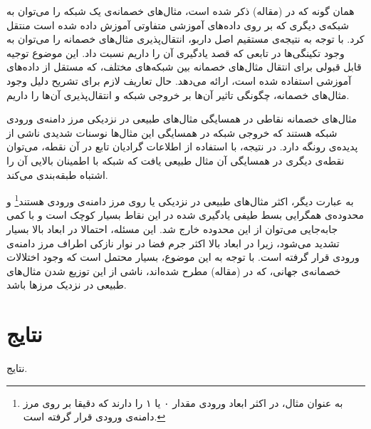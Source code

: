 \documentclass[12pt,onecolumn,a4paper]{article}
\begin{document}
همان گونه که در (مقاله) ذکر شده است، مثال‌های خصمانه‌ی یک شبکه را می‌توان به شبکه‌ی دیگری که بر روی داده‌های آموزشی متفاوتی آموزش داده شده است منتقل کرد. با توجه به نتیجه‌ی مستقیم اصل داربو، انتقال‌پذیری مثال‌های خصمانه را می‌توان به وجود تکینگی‌ها در تابعی که قصد یادگیری آن را داریم نسبت داد. این موضوع توجیه قابل قبولی برای انتقال مثال‌های خصمانه بین شبکه‌های مختلف، که مستقل از داده‌های آموزشی استفاده شده است، ارائه می‌دهد. حال تعاریف لازم برای تشریح دلیل وجود مثال‌های خصمانه، چگونگی تاثیر آن‌ها بر خروجی شبکه و انتقال‌پذیری آن‌ها را داریم.

مثال‌های خصمانه نقاطی در همسایگی مثال‌های طبیعی در نزدیکی مرز دامنه‌ی ورودی شبکه هستند که خروجی شبکه در همسایگی این مثال‌ها نوسنات شدیدی ناشی از پدیده‌ی رونگه دارد. در نتیجه، با استفاده از اطلاعات گرادیان تابع در آن نقطه، می‌توان نقطه‌ی دیگری در همسایگی آن مثال طبیعی یافت که شبکه با اطمینان بالایی آن را اشتباه طبقه‌بندی می‌کند.

به عبارت دیگر، اکثر مثال‌های طبیعی در نزدیکی یا روی مرز دامنه‌ی ورودی هستند\footnote{به عنوان مثال، در 
اکثر ابعاد ورودی مقدار ۰ یا ۱ را دارند که دقیقا بر روی مرز دامنه‌ی ورودی قرار گرفته است.}
و محدوده‌ی همگرایی بسط طیفی یادگیری شده در این نقاط بسیار کوچک است و با کمی جابه‌جایی می‌توان از این محدوده خارج شد. این مسئله، احتمالا در ابعاد بالا بسیار تشدید می‌شود، زیرا در ابعاد بالا اکثر جرم فضا در نوار نازکی اطراف مرز دامنه‌ی ورودی قرار گرفته است. با توجه به این موضوع، بسیار محتمل است که وجود اختلالات خصمانه‌ی جهانی، که در (مقاله) مطرح شده‌اند، ناشی از این توزیع شدن مثال‌های طبیعی در نزدیک مرزها باشد.
\section{نتایج}
نتایج.
\end{document}
